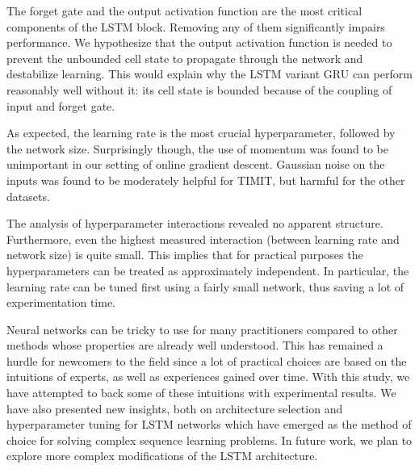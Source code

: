 The forget gate and the output activation function are the most critical components of the LSTM block. Removing any of them significantly impairs performance. We hypothesize that the output activation function is needed to prevent the unbounded cell state to propagate through the network and destabilize learning. This would explain why the LSTM variant GRU can perform reasonably well without it: its cell state is bounded because of the coupling of input and forget gate.

As expected, the learning rate is the most crucial hyperparameter, followed by the network size. Surprisingly though, the use of momentum was found to be unimportant in our setting of online gradient descent. Gaussian noise on the inputs was found to be moderately helpful for TIMIT, but harmful for the other datasets.

The analysis of hyperparameter interactions revealed no apparent structure. Furthermore, even the highest measured interaction (between learning rate and network size) is quite small. This implies that for practical purposes the hyperparameters can be treated as approximately independent. In particular, the learning rate can be tuned first using a fairly small network, thus saving a lot of experimentation time.

Neural networks can be tricky to use for many practitioners compared to other methods whose properties are already well understood. This has remained a hurdle for newcomers to the field since a lot of practical choices are based on the intuitions of experts, as well as experiences gained over time. With this study, we have attempted to back some of these intuitions with experimental results. We have also presented new insights, both on architecture selection and hyperparameter tuning for LSTM networks which have emerged as the method of choice for solving complex sequence learning problems. In future work, we plan to explore more complex modifications of the LSTM architecture.


